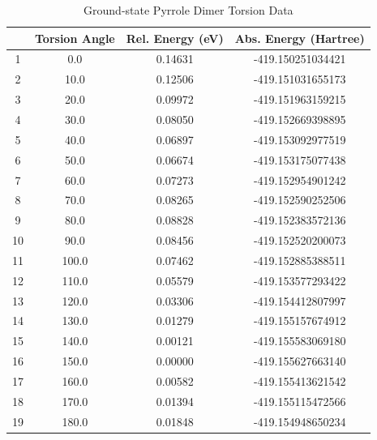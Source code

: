 \begin{table}[hbt!]\centering
\caption{Ground-state Pyrrole Dimer Torsion Data}
\renewcommand{\arraystretch}{1.5}
\begin{threeparttable}
\begin{tabular}{cccc}\toprule
  {} & {Torsion Angle} & {Rel. Energy (eV)} & {Abs. Energy (Hartree)} \\ \midrule
    1  & 0.0   & 0.14631 & -419.150251034421\\
    2  & 10.0  & 0.12506 & -419.151031655173\\
    3  & 20.0  & 0.09972 & -419.151963159215\\
    4  & 30.0  & 0.08050 & -419.152669398895\\ \midrule
    5  & 40.0  & 0.06897 & -419.153092977519\\
    6  & 50.0  & 0.06674 & -419.153175077438\\
    7  & 60.0  & 0.07273 & -419.152954901242\\
    8  & 70.0  & 0.08265 & -419.152590252506\\ \midrule
    9  & 80.0  & 0.08828 & -419.152383572136\\
    10 & 90.0  & 0.08456 & -419.152520200073\\
    11 & 100.0 & 0.07462 & -419.152885388511\\
    12 & 110.0 & 0.05579 & -419.153577293422\\ \midrule
    13 & 120.0 & 0.03306 & -419.154412807997\\
    14 & 130.0 & 0.01279 & -419.155157674912\\
    15 & 140.0 & 0.00121 & -419.155583069180\\
    16 & 150.0 & 0.00000 & -419.155627663140\\ \midrule
    17 & 160.0 & 0.00582 & -419.155413621542\\
    18 & 170.0 & 0.01394 & -419.155115472566\\
    19 & 180.0 & 0.01848 & -419.154948650234\\ \bottomrule
\end{tabular}
\begin{tablenotes}
\item
\end{tablenotes}
\end{threeparttable}
\end{table}


